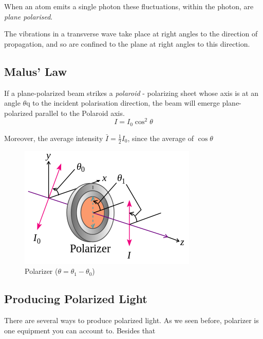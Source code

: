 \documentclass[openany]{book}
\begin{document}
When an atom emits a single photon these fluctuations, within the photon, are \emph{plane polarised}.

The vibrations in a transverse wave take place at right angles to the direction of propagation, and so are confined to the plane at right angles to this direction.
\subsection{Malus' Law}
If a plane-polarized beam strikes a \emph{polaroid} - polarizing sheet whose axis is at an angle $\theta$q to the incident polarisation direction, the beam will emerge plane-polarized parallel to the Polaroid axis.
\[I=I_0\cos ^2\theta \]

Moreover, the average intensity $\bar{I}=\frac{1}{2}I_0$, since the average of $\cos \theta $
\begin{figure}[H]
\centering
\label{fig:14}
\includegraphics[scale=0.5]{Figure/14.PNG}
\caption{Polarizer ($\theta = \theta _1-\theta _0$)}
\end{figure}
\subsection{Producing Polarized Light}
There are several ways to produce polarized light. As we seen before, polarizer is one equipment you can account to. Besides that
\end{document}
